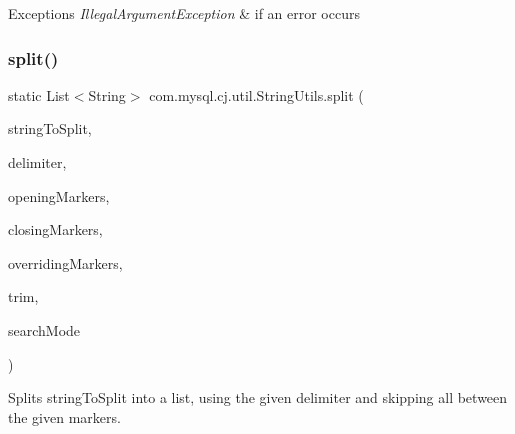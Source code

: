 \begin{DoxyExceptions}{Exceptions}
{\em Illegal\+Argument\+Exception} & if an error occurs \\
\hline
\end{DoxyExceptions}
\mbox{\label{classcom_1_1mysql_1_1cj_1_1util_1_1_string_utils_a6f82f2224187e8d46fd9dedf5da1965f}} 
\subsubsection{\texorpdfstring{split()}{split()}\hspace{0.1cm}{\footnotesize\ttfamily [5/5]}}
{\footnotesize\ttfamily static List$<$String$>$ com.\+mysql.\+cj.\+util.\+String\+Utils.\+split (\begin{DoxyParamCaption}\item[{String}]{string\+To\+Split,  }\item[{String}]{delimiter,  }\item[{String}]{opening\+Markers,  }\item[{String}]{closing\+Markers,  }\item[{String}]{overriding\+Markers,  }\item[{boolean}]{trim,  }\item[{Set$<$ \mbox{\hyperlink{enumcom_1_1mysql_1_1cj_1_1util_1_1_string_utils_1_1_search_mode}{Search\+Mode}} $>$}]{search\+Mode }\end{DoxyParamCaption})\hspace{0.3cm}{\ttfamily [static]}}

Splits string\+To\+Split into a list, using the given delimiter and skipping all between the given markers.


